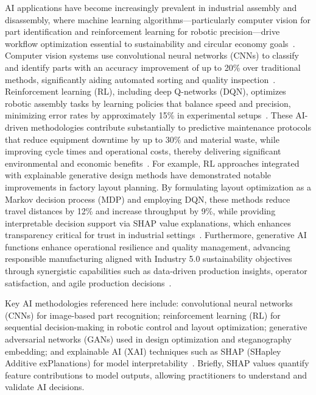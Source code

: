 \documentclass[sigconf]{acmart}
\begin{document}
AI applications have become increasingly prevalent in industrial assembly and disassembly, where machine learning algorithms—particularly computer vision for part identification and reinforcement learning for robotic precision—drive workflow optimization essential to sustainability and circular economy goals~\cite{ref6,ref9,ref44}. Computer vision systems use convolutional neural networks (CNNs) to classify and identify parts with an accuracy improvement of up to 20\% over traditional methods, significantly aiding automated sorting and quality inspection~\cite{ref44}. Reinforcement learning (RL), including deep Q-networks (DQN), optimizes robotic assembly tasks by learning policies that balance speed and precision, minimizing error rates by approximately 15\% in experimental setups~\cite{ref9}. These AI-driven methodologies contribute substantially to predictive maintenance protocols that reduce equipment downtime by up to 30\% and material waste, while improving cycle times and operational costs, thereby delivering significant environmental and economic benefits~\cite{ref7,ref13,ref36}. For example, RL approaches integrated with explainable generative design methods have demonstrated notable improvements in factory layout planning. By formulating layout optimization as a Markov decision process (MDP) and employing DQN, these methods reduce travel distances by 12\% and increase throughput by 9\%, while providing interpretable decision support via SHAP value explanations, which enhances transparency critical for trust in industrial settings~\cite{ref9}. Furthermore, generative AI functions enhance operational resilience and quality management, advancing responsible manufacturing aligned with Industry 5.0 sustainability objectives through synergistic capabilities such as data-driven production insights, operator satisfaction, and agile production decisions~\cite{ref6}.

Key AI methodologies referenced here include: convolutional neural networks (CNNs) for image-based part recognition; reinforcement learning (RL) for sequential decision-making in robotic control and layout optimization; generative adversarial networks (GANs) used in design optimization and steganography embedding; and explainable AI (XAI) techniques such as SHAP (SHapley Additive exPlanations) for model interpretability~\cite{ref6,ref7,ref9,ref44}. Briefly, SHAP values quantify feature contributions to model outputs, allowing practitioners to understand and validate AI decisions.
\end{document}
